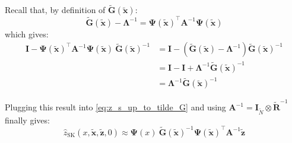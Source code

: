 Recall that, by definition of $\tilde{\mathbf{G}}(\tilde{\mathbf{x}})$:
\begin{equation}
	\tilde{\mathbf{G}}(\tilde{\mathbf{x}})-\boldsymbol{\Lambda}^{-1}=\boldsymbol{\Psi}(\tilde{\mathbf{x}})^\top \mathbf{A}^{-1}\boldsymbol{\Psi}(\tilde{\mathbf{x}})
\end{equation}
which gives:
\begin{equation}
	\begin{aligned}
	\mathbf{I}-\boldsymbol{\Psi}(\tilde{\mathbf{x}})^\top \mathbf{A}^{-1}\boldsymbol{\Psi}(\tilde{\mathbf{x}})\:\tilde{\mathbf{G}}(\tilde{\mathbf{x}})^{-1}&=\mathbf{I}-\left(\tilde{\mathbf{G}}(\tilde{\mathbf{x}})-\boldsymbol{\Lambda}^{-1}\right)\tilde{\mathbf{G}}(\tilde{\mathbf{x}})^{-1}\\
	&=\mathbf{I}-\mathbf{I}+\boldsymbol{\Lambda}^{-1}\tilde{\mathbf{G}}(\tilde{\mathbf{x}})^{-1}\\
	&=\boldsymbol{\Lambda}^{-1}\tilde{\mathbf{G}}(\tilde{\mathbf{x}})^{-1}
	\end{aligned}\label{eq:reduced_rank_lemma}
\end{equation}

Plugging this result into \eqref{eq:z_s_up_to_tilde_G} and using $\mathbf{A}^{-1}=\mathbf{I}_{\tilde{N}}\otimes\tilde{\mathbf{R}}^{-1}$ finally gives:
\begin{equation}
	\hat{z}_{\mathrm{SK}}(x,\tilde{\mathbf{x}},\tilde{\mathbf{z}},0)\approx\boldsymbol{\Psi}(x)\:\tilde{\mathbf{G}}(\tilde{\mathbf{x}})^{-1}\boldsymbol{\Psi}(\tilde{\mathbf{x}})^\top \mathbf{A}^{-1}\tilde{\mathbf{z}}
\end{equation}


